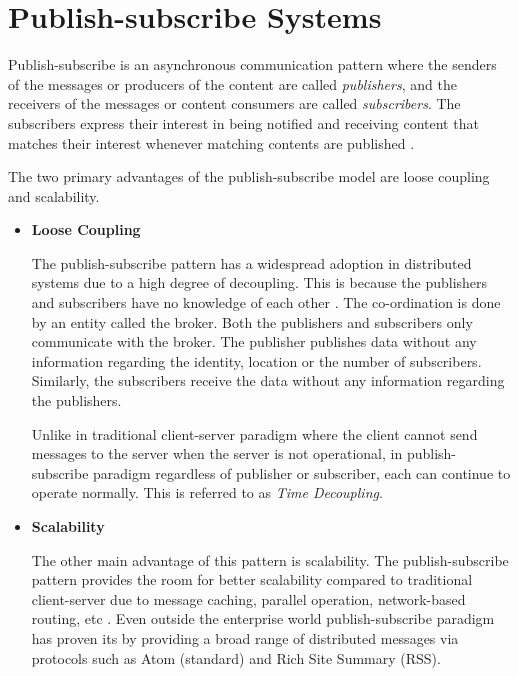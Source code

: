 \section{Publish-subscribe Systems}

Publish-subscribe is an asynchronous communication pattern where the senders of the messages or producers of the content are called \textit{publishers}, and the receivers of the messages or content consumers are called \textit{subscribers}. The subscribers express their interest in being notified and receiving content that matches their interest whenever matching contents are published \parencite{Pietzuch:2002:HDE:646854.708058}.

The two primary advantages of the publish-subscribe model are loose coupling and scalability.

\begin{itemize}
\item[]\textbf{Loose Coupling}

The publish-subscribe pattern has a widespread adoption in distributed systems due to a high degree of decoupling. This is because the publishers and subscribers have no knowledge of each other \parencite{Cheung:2010:LBC:1880018.1880020}. The co-ordination is done by an entity called the broker. Both the publishers and subscribers only communicate with the broker. The publisher publishes data without any information regarding the identity, location or the number of subscribers. Similarly, the subscribers receive the data without any information regarding the publishers. 

Unlike in traditional client-server paradigm where the client cannot send messages to the server when the server is not operational, in publish-subscribe paradigm regardless of publisher or subscriber, each can continue to operate normally. This is referred to as \textit {Time Decoupling}.   

\item[]\textbf{Scalability}

The other main advantage of this pattern is scalability. The publish-subscribe pattern provides the room for better scalability compared to traditional client-server due to message caching, parallel operation, network-based routing, etc \parencite{hivemqbroker}. Even outside the enterprise world publish-subscribe paradigm has proven its by providing a broad range of distributed messages via protocols such as Atom (standard) and Rich Site Summary (RSS).

\end{itemize}

